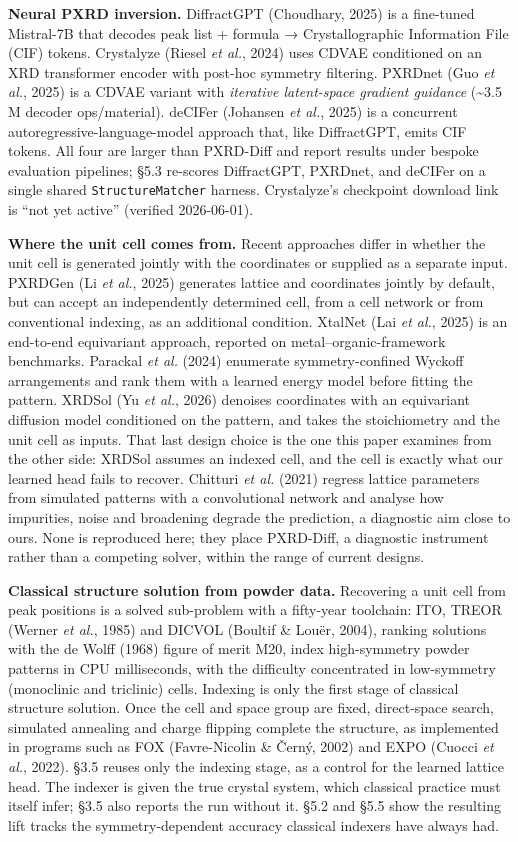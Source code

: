 \documentclass[
  11pt,
]{article}
\begin{document}
\textbf{Neural PXRD inversion.} DiffractGPT (Choudhary, 2025) is a
fine-tuned Mistral-7B that decodes peak list + formula →
Crystallographic Information File (CIF) tokens. Crystalyze (Riesel
\emph{et al.}, 2024) uses CDVAE conditioned on an XRD transformer
encoder with post-hoc symmetry filtering. PXRDnet (Guo \emph{et al.},
2025) is a CDVAE variant with \emph{iterative latent-space gradient
guidance} (\textasciitilde3.5 M decoder ops/material). deCIFer (Johansen
\emph{et al.}, 2025) is a concurrent autoregressive-language-model
approach that, like DiffractGPT, emits CIF tokens. All four are larger
than PXRD-Diff and report results under bespoke evaluation pipelines;
§5.3 re-scores DiffractGPT, PXRDnet, and deCIFer on a single shared
\texttt{StructureMatcher} harness. Crystalyze's checkpoint download link
is ``not yet active'' (verified 2026-06-01).

\textbf{Where the unit cell comes from.} Recent approaches differ in
whether the unit cell is generated jointly with the coordinates or
supplied as a separate input. PXRDGen (Li \emph{et al.}, 2025) generates
lattice and coordinates jointly by default, but can accept an
independently determined cell, from a cell network or from conventional
indexing, as an additional condition. XtalNet (Lai \emph{et al.}, 2025)
is an end-to-end equivariant approach, reported on
metal--organic-framework benchmarks. Parackal \emph{et al.} (2024)
enumerate symmetry-confined Wyckoff arrangements and rank them with a
learned energy model before fitting the pattern. XRDSol (Yu \emph{et
al.}, 2026) denoises coordinates with an equivariant diffusion model
conditioned on the pattern, and takes the stoichiometry and the unit
cell as inputs. That last design choice is the one this paper examines
from the other side: XRDSol assumes an indexed cell, and the cell is
exactly what our learned head fails to recover. Chitturi \emph{et al.}
(2021) regress lattice parameters from simulated patterns with a
convolutional network and analyse how impurities, noise and broadening
degrade the prediction, a diagnostic aim close to ours. None is
reproduced here; they place PXRD-Diff, a diagnostic instrument rather
than a competing solver, within the range of current designs.

\textbf{Classical structure solution from powder data.} Recovering a
unit cell from peak positions is a solved sub-problem with a fifty-year
toolchain: ITO, TREOR (Werner \emph{et al.}, 1985) and DICVOL (Boultif
\& Louër, 2004), ranking solutions with the de Wolff (1968) figure of
merit M20, index high-symmetry powder patterns in CPU milliseconds, with
the difficulty concentrated in low-symmetry (monoclinic and triclinic)
cells. Indexing is only the first stage of classical structure solution.
Once the cell and space group are fixed, direct-space search, simulated
annealing and charge flipping complete the structure, as implemented in
programs such as FOX (Favre-Nicolin \& Černý, 2002) and EXPO (Cuocci
\emph{et al.}, 2022). §3.5 reuses only the indexing stage, as a control
for the learned lattice head. The indexer is given the true crystal
system, which classical practice must itself infer; §3.5 also reports
the run without it. §5.2 and §5.5 show the resulting lift tracks the
symmetry-dependent accuracy classical indexers have always had.
\end{document}
